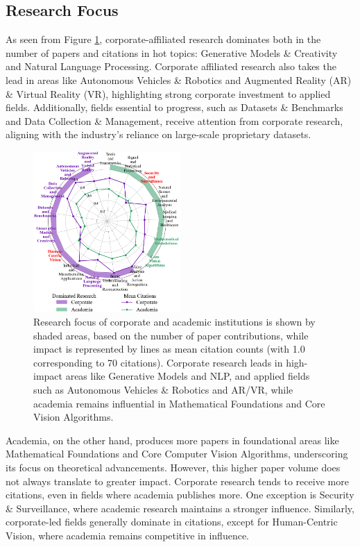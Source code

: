 \documentclass{article}
\begin{document}
\subsection{Research Focus}
\vspace{-7pt}
As seen from Figure \ref{fig:research_focus_radar}, corporate-affiliated research dominates both in the number of papers and citations in hot topics: Generative Models \& Creativity and Natural Language Processing. Corporate
affiliated research also takes the lead in areas like Autonomous Vehicles \& Robotics and Augmented Reality (AR) \& Virtual Reality (VR), highlighting strong corporate investment to applied fields. Additionally, fields essential to progress, such as Datasets \& Benchmarks and Data Collection \& Management, receive attention from corporate research, aligning with the industry's reliance on large-scale proprietary datasets.
\begin{figure}
\centering
\vspace{-15pt}
\includegraphics[width=0.5\textwidth]{report/images/citation_radar_plot.png}  
\caption{Research focus of corporate and academic institutions is shown by shaded areas, based on the number of paper contributions, while impact is represented by lines as mean citation counts (with 1.0 corresponding to 70 citations). Corporate research leads in high-impact areas like Generative Models and NLP, and applied fields such as Autonomous Vehicles \& Robotics and AR/VR, while academia remains influential in Mathematical Foundations and Core Vision Algorithms.}
\label{fig:research_focus_radar}

\end{figure}
Academia, on the other hand, produces more papers in foundational areas like Mathematical Foundations and Core Computer Vision Algorithms, underscoring its focus on theoretical advancements. However, this higher paper volume does not always translate to greater impact. Corporate research tends to receive more citations, even in fields where academia publishes more. One exception is Security \& Surveillance, where academic research maintains a stronger influence. Similarly, corporate-led fields generally dominate in citations, except for Human-Centric Vision, where academia remains competitive in influence. 
\end{document}
